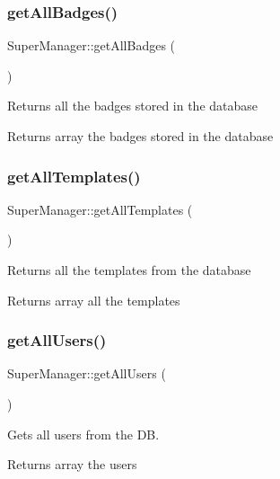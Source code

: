 \subsubsection{\texorpdfstring{get\+All\+Badges()}{getAllBadges()}}
{\footnotesize\ttfamily Super\+Manager\+::get\+All\+Badges (\begin{DoxyParamCaption}{ }\end{DoxyParamCaption})}

Returns all the badges stored in the database \begin{DoxyReturn}{Returns}
array the badges stored in the database 
\end{DoxyReturn}
\mbox{\label{classSuperManager_a2815b1d6986d42f6581c48460df37b7f}} 
\subsubsection{\texorpdfstring{get\+All\+Templates()}{getAllTemplates()}}
{\footnotesize\ttfamily Super\+Manager\+::get\+All\+Templates (\begin{DoxyParamCaption}{ }\end{DoxyParamCaption})}

Returns all the templates from the database \begin{DoxyReturn}{Returns}
array all the templates 
\end{DoxyReturn}
\mbox{\label{classSuperManager_a1d13928519ef298511689f791ee20f47}} 
\subsubsection{\texorpdfstring{get\+All\+Users()}{getAllUsers()}}
{\footnotesize\ttfamily Super\+Manager\+::get\+All\+Users (\begin{DoxyParamCaption}{ }\end{DoxyParamCaption})}

Gets all users from the DB. \begin{DoxyReturn}{Returns}
array the users 
\end{DoxyReturn}
\mbox{\label{classSuperManager_af5a189e3061acbf92dc040183b4eaefc}} 
